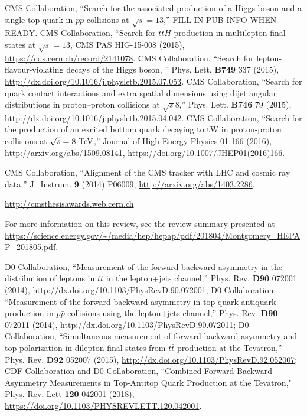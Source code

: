 \begin{thebibliography}{99}
     CMS Collaboration, ``Search for the associated
    production of a Higgs boson and a single top quark in $pp$ collisions
    at $\sqrt{s} = 13$\TeV,'' FILL IN PUB INFO WHEN READY.
 CMS Collaboration, ``Search for $t\bar{t}H$
  production in multilepton final states at $\sqrt{s} = 13$\TeV, CMS PAS
  HIG-15-008 (2015), \url{https://cds.cern.ch/record/2141078}.
 CMS Collaboration, ``Search for lepton-flavour-violating decays of the Higgs boson, '' Phys. Lett. {\bf B749} 337 (2015), \url{http://dx.doi.org/10.1016/j.physletb.2015.07.053}.
CMS Collaboration, ``Search for quark contact interactions and extra spatial dimensions using dijet angular distributions in proton–proton collisions at $\sqrt{s}$8\TeV,'' Phys. Lett. {\bf B746} 79 (2015), \url{http://dx.doi.org/10.1016/j.physletb.2015.04.042}.
CMS Collaboration, ``Search for the production of an excited bottom quark decaying to tW in proton-proton collisions at $\sqrt{s} = 8\TeV$,'' Journal of High Energy Physics 01 166 (2016),  \url{http://arxiv.org/abs/1509.08141}, \url{https://doi.org/10.1007/JHEP01(2016)166}.

CMS Collaboration, ``Alignment of the CMS tracker with LHC and cosmic ray data,'' J.~Instrum. \textbf{9} (2014) P06009, \url{http://arxiv.org/abs/1403.2286}.

 \url{http://cmsthesisawards.web.cern.ch}

 For more information on this review, see the review summary presented at \url{https://science.energy.gov/~/media/hep/hepap/pdf/201804/Montgomery_HEPAP_201805.pdf}.


D0 Collaboration, ``Measurement of the forward-backward asymmetry in the distribution of leptons in $t\bar{t}$ in the lepton+jets channel,'' Phys. Rev. {\bf D90} 072001 (2014), \url{http://dx.doi.org/10.1103/PhysRevD.90.072001};
D0 Collaboration, ``Measurement of the forward-backward asymmetry in top quark-antiquark production in $p\bar{p}$ collisions using the lepton+jets channel,'' Phys. Rev. {\bf D90} 072011 (2014), \url{http://dx.doi.org/10.1103/PhysRevD.90.072011};
D0 Collaboration, ``Simultaneous measurement of forward-backward asymmetry and top polarization in dilepton final states from $t\bar{t}$ production at the Tevatron,'' Phys. Rev. {\bf D92} 052007 (2015), \url{http://dx.doi.org/10.1103/PhysRevD.92.052007};
CDF Collaboration and D0 Collaboration, ``Combined Forward-Backward Asymmetry Measurements in Top-Antitop Quark Production at the Tevatron," Phys. Rev. Lett {\bf 120} 042001 (2018), \url{https://doi.org/10.1103/PHYSREVLETT.120.042001}.


\end{thebibliography}
